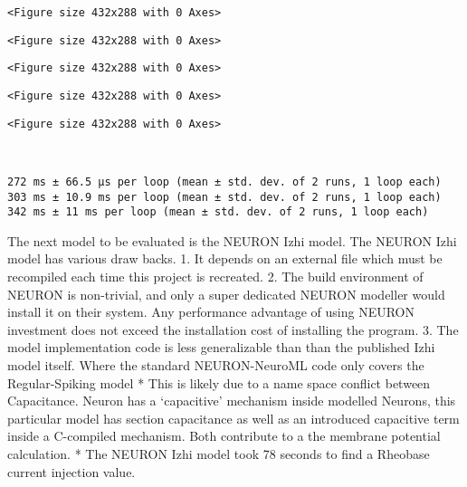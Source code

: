     
    
    \begin{verbatim}
<Figure size 432x288 with 0 Axes>
    \end{verbatim}

    
    
    \begin{verbatim}
<Figure size 432x288 with 0 Axes>
    \end{verbatim}

    
    
    \begin{verbatim}
<Figure size 432x288 with 0 Axes>
    \end{verbatim}

    
    
    \begin{verbatim}
<Figure size 432x288 with 0 Axes>
    \end{verbatim}

    
    
    \begin{verbatim}
<Figure size 432x288 with 0 Axes>
    \end{verbatim}

    
    \begin{center}
    \end{center}
    { \hspace*{\fill} \\}
    
    \begin{Verbatim}[commandchars=\\\{\}]
272 ms ± 66.5 µs per loop (mean ± std. dev. of 2 runs, 1 loop each)
303 ms ± 10.9 ms per loop (mean ± std. dev. of 2 runs, 1 loop each)
342 ms ± 11 ms per loop (mean ± std. dev. of 2 runs, 1 loop each)
    \end{Verbatim}

    The next model to be evaluated is the NEURON Izhi model. The NEURON Izhi
model has various draw backs. 1. It depends on an external file which
must be recompiled each time this project is recreated. 2. The build
environment of NEURON is non-trivial, and only a super dedicated NEURON
modeller would install it on their system. Any performance advantage of
using NEURON investment does not exceed the installation cost of
installing the program. 3. The model implementation code is less
generalizable than than the published Izhi model itself. Where the
standard NEURON-NeuroML code only covers the Regular-Spiking model *
This is likely due to a name space conflict between Capacitance. Neuron
has a `capacitive' mechanism inside modelled Neurons, this particular
model has section capacitance as well as an introduced capacitive term
inside a C-compiled mechanism. Both contribute to a the membrane
potential calculation. * The NEURON Izhi model took 78 seconds to find a
Rheobase current injection value.

